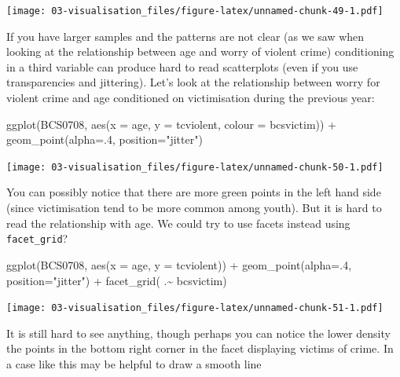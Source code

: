 \documentclass[
]{book}
\newenvironment{Shaded}{\begin{snugshade}}{\end{snugshade}}
\newcommand{\AttributeTok}[1]{\textcolor[rgb]{0.77,0.63,0.00}{#1}}
\newcommand{\DecValTok}[1]{\textcolor[rgb]{0.00,0.00,0.81}{#1}}
\newcommand{\FunctionTok}[1]{\textcolor[rgb]{0.00,0.00,0.00}{#1}}
\newcommand{\NormalTok}[1]{#1}
\newcommand{\SpecialCharTok}[1]{\textcolor[rgb]{0.00,0.00,0.00}{#1}}
\newcommand{\StringTok}[1]{\textcolor[rgb]{0.31,0.60,0.02}{#1}}
\begin{document}
\texttt{[image: 03-visualisation\_files/figure-latex/unnamed-chunk-49-1.pdf]}

If you have larger samples and the patterns are not clear (as we saw when looking at the relationship between age and worry of violent crime) conditioning in a third variable can produce hard to read scatterplots (even if you use transparencies and jittering). Let's look at the relationship between worry for violent crime and age conditioned on victimisation during the previous year:

\begin{Shaded}
\begin{Highlighting}[]
\FunctionTok{ggplot}\NormalTok{(BCS0708, }\FunctionTok{aes}\NormalTok{(}\AttributeTok{x =}\NormalTok{ age, }\AttributeTok{y =}\NormalTok{ tcviolent, }\AttributeTok{colour =}\NormalTok{ bcsvictim)) }\SpecialCharTok{+}
  \FunctionTok{geom\_point}\NormalTok{(}\AttributeTok{alpha=}\NormalTok{.}\DecValTok{4}\NormalTok{, }\AttributeTok{position=}\StringTok{"jitter"}\NormalTok{)}
\end{Highlighting}
\end{Shaded}

\texttt{[image: 03-visualisation\_files/figure-latex/unnamed-chunk-50-1.pdf]}

You can possibly notice that there are more green points in the left hand side (since victimisation tend to be more common among youth). But it is hard to read the relationship with age. We could try to use facets instead using \texttt{facet\_grid}?

\begin{Shaded}
\begin{Highlighting}[]
\FunctionTok{ggplot}\NormalTok{(BCS0708, }\FunctionTok{aes}\NormalTok{(}\AttributeTok{x =}\NormalTok{ age, }\AttributeTok{y =}\NormalTok{ tcviolent)) }\SpecialCharTok{+}
  \FunctionTok{geom\_point}\NormalTok{(}\AttributeTok{alpha=}\NormalTok{.}\DecValTok{4}\NormalTok{, }\AttributeTok{position=}\StringTok{"jitter"}\NormalTok{) }\SpecialCharTok{+}
  \FunctionTok{facet\_grid}\NormalTok{( .}\SpecialCharTok{\textasciitilde{}}\NormalTok{ bcsvictim)}
\end{Highlighting}
\end{Shaded}

\texttt{[image: 03-visualisation\_files/figure-latex/unnamed-chunk-51-1.pdf]}

It is still hard to see anything, though perhaps you can notice the lower density the points in the bottom right corner in the facet displaying victims of crime. In a case like this may be helpful to draw a smooth line
\end{document}
